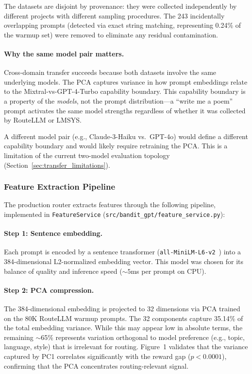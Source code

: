 The datasets are disjoint by provenance: they were collected independently by
different projects with different sampling procedures.  The 243 incidentally
overlapping prompts (detected via exact string matching, representing 0.24\% of
the warmup set) were removed to eliminate any residual contamination.

\paragraph{Why the same model pair matters.}
Cross-domain transfer succeeds because both datasets involve the same
underlying models.  The PCA captures variance in how prompt embeddings relate
to the Mixtral-vs-GPT-4-Turbo capability boundary.  This capability boundary
is a property of the \emph{models}, not the prompt distribution---a
``write me a poem'' prompt activates the same model strengths regardless of
whether it was collected by RouteLLM or LMSYS.

A different model pair (e.g., Claude-3-Haiku vs.\ GPT-4o) would define a
different capability boundary and would likely require retraining the PCA.
This is a limitation of the current two-model evaluation topology
(Section~\ref{sec:transfer_limitations}).

\subsubsection{Feature Extraction Pipeline}

The production router extracts features through the following pipeline,
implemented in \texttt{FeatureService} (\texttt{src/bandit\_gpt/feature\_service.py}):

\paragraph{Step 1: Sentence embedding.}
Each prompt is encoded by a sentence transformer
(\texttt{all-MiniLM-L6-v2}~\cite{reimers2019sentencebert}) into a
384-dimensional L2-normalized embedding vector.  This model was chosen for its
balance of quality and inference speed (${\sim}5$ms per prompt on CPU).

\paragraph{Step 2: PCA compression.}
The 384-dimensional embedding is projected to 32 dimensions via PCA trained on
the 80K RouteLLM warmup prompts.  The 32 components capture 35.14\% of the
total embedding variance.  While this may appear low in absolute terms,
the remaining ${\sim}$65\% represents variation orthogonal to model preference
(e.g., topic, language, style) that is irrelevant for routing.
Figure~1 validates that the variance captured by PC1 correlates
significantly with the reward gap ($p < 0.0001$), confirming that the
PCA concentrates routing-relevant signal.

